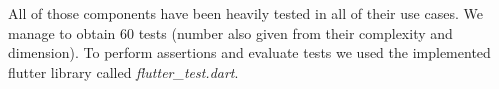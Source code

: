 \noindent All of those components have been heavily tested in all of their use cases. We manage to obtain 60 tests (number also given from their complexity and dimension).
\newline
\newline
\noindent To perform assertions and evaluate tests we used the implemented flutter library called \textit{flutter\_test.dart}.

\newpage